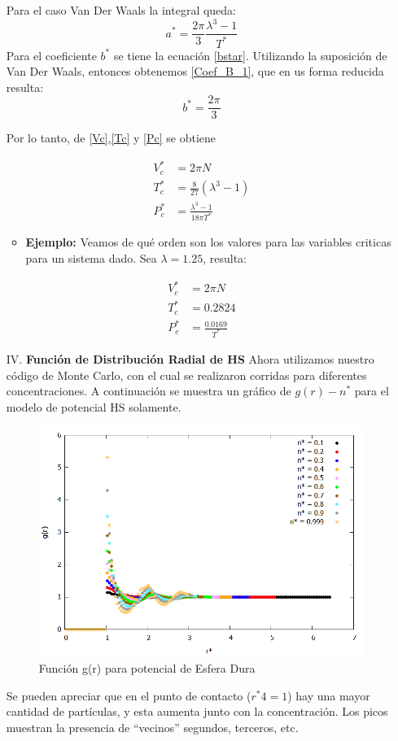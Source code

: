 \documentclass[12pt,letterpaper]{article}
\begin{document}
\begin{enumerate}
Para el caso Van Der Waals la integral queda:
\begin{equation}
a^* = \frac{2\pi}{3} \frac{\lambda^3-1}{T^*}
\end{equation}
Para el coeficiente $b^*$ se tiene la ecuación \eqref{bstar}. Utilizando la suposición de Van Der Waals, entonces obtenemos \eqref{Coef_B_1}, que en us forma reducida resulta:
\begin{equation}
b^* = \frac{2\pi}{3}
\end{equation}

Por lo tanto, de \eqref{Vc},\eqref{Tc} y \eqref{Pc} se obtiene

\begin{align}
V_c^* &= 2\pi N \label{Vcs} \\
T_c^* &= \frac{8}{27}(\lambda^3 -1) \label{Tcs}\\
P_c^* &= \frac{\lambda^3-1}{18\pi T^*} \label{Pcs}
\end{align}
\begin{itemize}
\item \textbf{Ejemplo:} Veamos de qué orden son los valores para las variables criticas para un sistema dado. Sea $\lambda=1.25$, resulta:
\end{itemize}
\begin{align*}
V_c^* &= 2\pi N  \\
T_c^* &= 0.2824 \\
P_c^* &= \frac{0.0169}{ T^*} 
\end{align*}


\item[IV.]\textbf{Función de Distribución Radial de HS} Ahora utilizamos nuestro código de Monte Carlo, con el cual se realizaron corridas para diferentes concentraciones. A continuación se muestra un gráfico de $g(r)-n^*$ para el modelo de potencial HS solamente.
\begin{figure}[H]
	\centering
	\includegraphics[width=0.75\linewidth]{GDR.png}
	\caption{Función g(r) para potencial de Esfera Dura}
	\label{Fig:GDR_HS}
\end{figure}
 Se pueden apreciar que en el punto de contacto ($r^*4=1$) hay una mayor cantidad de partículas, y esta aumenta junto con la concentración. Los picos muestran la presencia de ``vecinos'' segundos, terceros, etc.
 

\end{enumerate}
\end{document}
